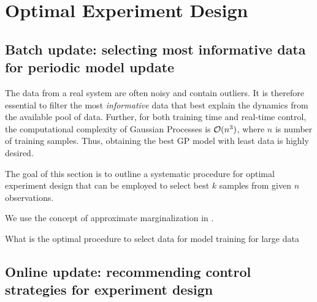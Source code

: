 \section{Optimal Experiment Design}
\label{S:oed}

\subsection{Batch update: selecting most informative data for periodic model update}

The data from a real system are often noisy and contain outliers. 
It is therefore essential to filter the most \textit{informative} data that best explain the dynamics from the available pool of data.
Further, for both training time and real-time control, the computational complexity of Gaussian Processes is $\mathcal{O}(n^3)$, where $n$ is number of training samples. Thus, obtaining the best GP model with least data is highly desired.

The goal of this section is to outline a systematic procedure for optimal experiment design that can be employed to select best $k$ samples from given $n$ observations.


We use the concept of approximate marginalization in \cite{Garnett2013}.

What is the optimal procedure to select data for model training for large data

\subsection{Online update: recommending control strategies for experiment design }
